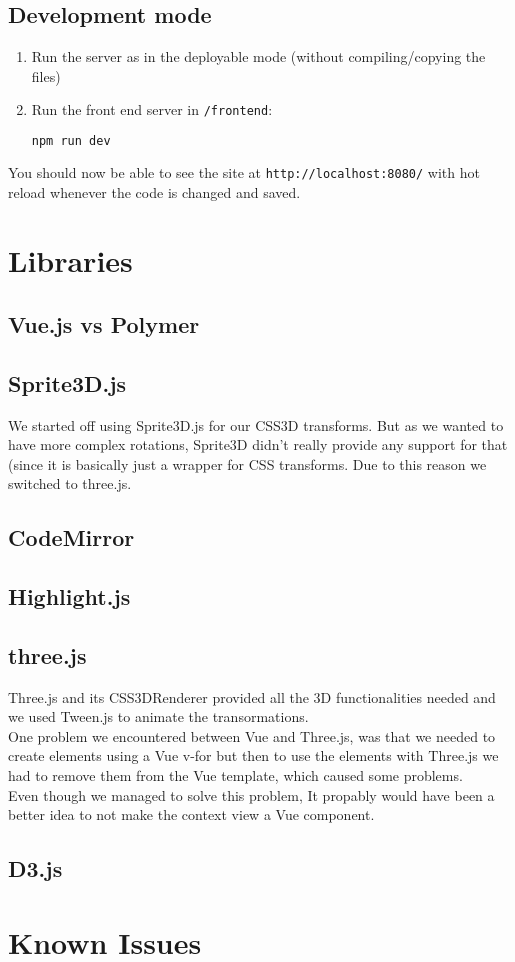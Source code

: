 \documentclass[a4paper]{article}
\begin{document}
\subsection{Development mode}
\begin{enumerate}
\item Run the server as in the deployable mode (without compiling/copying the files)
\item Run the front end server in \texttt{/frontend}:
\begin{lstlisting}[language=bash]
npm run dev
\end{lstlisting}
\end{enumerate}
You should now be able to see the site at \texttt{http://localhost:8080/} with hot reload whenever the code is changed and saved.
\begin{multicols}{2}
\section{Libraries}
\subsection{Vue.js vs Polymer}
\subsection{Sprite3D.js}
We started off using Sprite3D.js for our CSS3D transforms. But as we wanted to have more complex rotations, Sprite3D didn't really provide any support for that (since it is basically just a wrapper for CSS transforms.
Due to this reason we   switched to three.js.
\subsection{CodeMirror}
\subsection{Highlight.js}
\subsection{three.js}
Three.js and its CSS3DRenderer provided all the 3D functionalities needed and we used Tween.js to animate the transormations. 
\\One problem we encountered between Vue and Three.js, was that we needed to create elements using a Vue v-for but then to use the elements with Three.js we had to remove them from the Vue template, which caused some problems. \\
Even though  we managed to solve this problem, It propably would have been a better idea to not make the context view a Vue component.
\subsection{D3.js}
\section{Known Issues}

\end{multicols}
\end{document}
